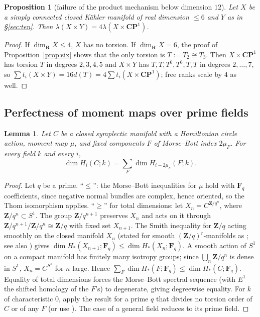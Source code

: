\documentclass[11pt]{amsart}
\numberwithin{equation}{section}
\newtheorem{lemma}[theorem]{Lemma}
\newtheorem{proposition}[theorem]{Proposition}
\theoremstyle{definition}
\theoremstyle{remark}
\newcommand{\CP}{\mathbf{CP}}
\newcommand{\Z}{\mathbf Z}
\newcommand{\R}{\mathbf R}
\newcommand{\F}{\mathbf F}
\begin{document}
\begin{proposition}[failure of the product mechanism below dimension $12$]\label{prop:productfail}
Let $X$ be a simply connected closed K\"ahler manifold of real dimension
$\le6$ and $Y$ as in \S\ref{sec:ten}. Then
$\lambda(X\times Y)=4\lambda(X\times\CP^1)$.
\end{proposition}

\begin{proof}
If $\dim_\R X\le4$, $X$ has no torsion. If $\dim_\R X=6$, the proof of
Proposition~\ref{prop:six} shows that the only torsion is $T:=T_2\cong T_3$. Then
$X\times\CP^1$ has torsion $T$ in degrees $2,3,4,5$ and $X\times Y$ has
$T,T,T^6,T^6,T,T$ in degrees $2,\dots,7$, so
$\sum t_i(X\times Y)=16d(T)=4\sum t_i(X\times\CP^1)$; free ranks scale by
$4$ as well.
\end{proof}

\subsection{Perfectness of moment maps over prime fields}

\begin{lemma}\label{lem:perfect}
Let $C$ be a closed symplectic manifold with a Hamiltonian circle action,
moment map $\mu$, and fixed components $F$ of Morse--Bott index $2\mu_F$.
For every field $k$ and every $i$,
\[
  \dim H_i(C;k)=\sum_F\dim H_{i-2\mu_F}(F;k).
\]
\end{lemma}

\begin{proof}
Let $q$ be a prime. ``$\le$'': the Morse--Bott inequalities for $\mu$ hold
with $\F_q$ coefficients, since negative normal bundles are complex,
hence oriented, so the Thom isomorphism applies. ``$\ge$'' for total
dimensions: let $X_n=C^{\Z/q^n}$, where $\Z/q^n\subset S^1$. The group
$\Z/q^{n+1}$ preserves $X_n$ and acts on it through
$\Z/q^{n+1}/\Z/q^n\cong\Z/q$ with fixed set $X_{n+1}$. The Smith
inequality for $\Z/q$ acting smoothly on the closed manifold $X_n$
\cite[Prop.~III.4.16]{tomDieck1987} (stated for smooth $(\Z/q)^r$-manifolds
as \cite[Prop.~2.1]{Franz2016}; see also \cite[Ch.~III]{Bredon1972}) gives
$\dim H_*(X_{n+1};\F_q)\le\dim H_*(X_n;\F_q)$. A smooth action of $S^1$ on a compact manifold has
finitely many isotropy groups; since $\bigcup_n\Z/q^n$ is dense in $S^1$,
$X_n=C^{S^1}$ for $n$ large. Hence
$\sum_F\dim H_*(F;\F_q)\le\dim H_*(C;\F_q)$. Equality of total dimensions
forces the Morse--Bott spectral sequence (with $E^1$ the shifted homology of
the $F$'s) to degenerate, giving degreewise equality. For $k$ of
characteristic $0$, apply the result for a prime $q$ that divides no
torsion order of $C$ or of any $F$ (or use \cite{Frankel1959,Kirwan1984}).
The case of a general field reduces to its prime field.
\end{proof}
\end{document}
